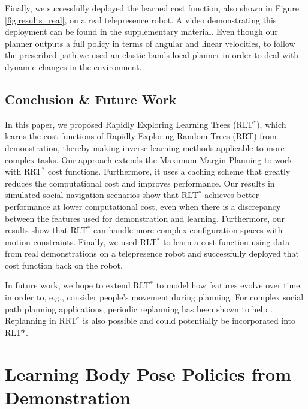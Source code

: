 \documentclass[a4paper,11pt]{report}
\begin{document}
	Finally, we successfully deployed the learned cost function, also shown in Figure \ref{fig:results_real}, on a real telepresence robot. A video demonstrating this deployment can be found in the supplementary material. Even though our planner outputs a full policy in terms of angular and linear velocities, to follow the prescribed path we used an elastic bands local planner in order to deal with dynamic changes in the environment.%



\vspace{-1mm}
\subsection{Conclusion \& Future Work}
In this paper, we proposed Rapidly Exploring Learning Trees (RLT$^*$), which learns the cost functions of Rapidly Exploring Random Trees (RRT) from demonstration, thereby making inverse learning methods applicable to more complex tasks. Our approach extends the Maximum Margin Planning to work with RRT$^*$ cost functions. Furthermore, it uses a caching scheme that greatly reduces the computational cost and improves performance. Our results in simulated social navigation scenarios show that RLT$^*$ achieves better performance at lower computational cost, even when there is a discrepancy between the features used for demonstration and learning. Furthermore, our results show that RLT$^*$ can handle more complex configuration spaces with motion constraints. Finally, we used RLT$^*$ to learn a cost function using data from real demonstrations on a telepresence robot and successfully deployed that cost function back on the robot.

In future work, we hope to extend RLT$^*$ to model how features evolve over time, in order to, e.g., consider people's movement during planning.  For complex social path planning applications, periodic replanning has been shown to help \cite{henry2010learning,vasquez2014inverse}. Replanning in RRT$^*$ is also possible \cite{otte2015rrtx} and could potentially be incorporated into RLT$*$.


\clearpage





\section{Learning Body Pose Policies from Demonstration}
\label{sec:sl_policy}
\end{document}

